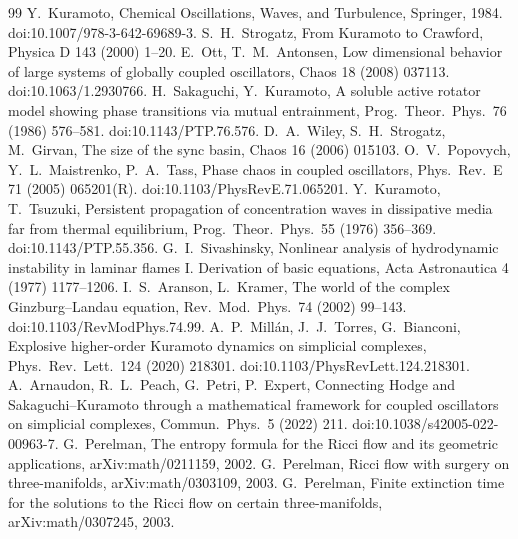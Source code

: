 \documentclass[10pt]{article}
\theoremstyle{definition}
\begin{document}
\begin{thebibliography}{99}
 Y.~Kuramoto, Chemical Oscillations, Waves, and Turbulence, Springer, 1984. doi:10.1007/978-3-642-69689-3.
 S.~H.~Strogatz, From Kuramoto to Crawford, Physica D 143 (2000) 1--20.
 E.~Ott, T.~M.~Antonsen, Low dimensional behavior of large systems of globally coupled oscillators, Chaos 18 (2008) 037113. doi:10.1063/1.2930766.
 H.~Sakaguchi, Y.~Kuramoto, A soluble active rotator model showing phase transitions via mutual entrainment, Prog.\ Theor.\ Phys.\ 76 (1986) 576--581. doi:10.1143/PTP.76.576.
 D.~A.~Wiley, S.~H.~Strogatz, M.~Girvan, The size of the sync basin, Chaos 16 (2006) 015103.
 O.~V.~Popovych, Y.~L.~Maistrenko, P.~A.~Tass, Phase chaos in coupled oscillators, Phys.\ Rev.\ E 71 (2005) 065201(R). doi:10.1103/PhysRevE.71.065201.
 Y.~Kuramoto, T.~Tsuzuki, Persistent propagation of concentration waves in dissipative media far from thermal equilibrium, Prog.\ Theor.\ Phys.\ 55 (1976) 356--369. doi:10.1143/PTP.55.356.
 G.~I.~Sivashinsky, Nonlinear analysis of hydrodynamic instability in laminar flames I. Derivation of basic equations, Acta Astronautica 4 (1977) 1177--1206.
 I.~S.~Aranson, L.~Kramer, The world of the complex Ginzburg--Landau equation, Rev.\ Mod.\ Phys.\ 74 (2002) 99--143. doi:10.1103/RevModPhys.74.99.
 A.~P.~Mill\'an, J.~J.~Torres, G.~Bianconi, Explosive higher-order Kuramoto dynamics on simplicial complexes, Phys.\ Rev.\ Lett.\ 124 (2020) 218301. doi:10.1103/PhysRevLett.124.218301.
 A.~Arnaudon, R.~L.~Peach, G.~Petri, P.~Expert, Connecting Hodge and Sakaguchi--Kuramoto through a mathematical framework for coupled oscillators on simplicial complexes, Commun.\ Phys.\ 5 (2022) 211. doi:10.1038/s42005-022-00963-7.
 G.~Perelman, The entropy formula for the Ricci flow and its geometric applications, arXiv:math/0211159, 2002.
 G.~Perelman, Ricci flow with surgery on three-manifolds, arXiv:math/0303109, 2003.
 G.~Perelman, Finite extinction time for the solutions to the Ricci flow on certain three-manifolds, arXiv:math/0307245, 2003.
\end{thebibliography}
\end{document}
